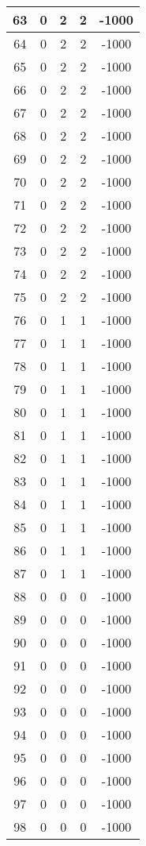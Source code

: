 \documentclass[letterpaper, 12pt]{article}
\begin{document}
\begin{longtable}{|c|c|c|c|c|}
\hline
63 & 0 & 2 & 2 & -1000 \\
\hline
64 & 0 & 2 & 2 & -1000 \\
\hline
65 & 0 & 2 & 2 & -1000 \\
\hline
66 & 0 & 2 & 2 & -1000 \\
\hline
67 & 0 & 2 & 2 & -1000 \\
\hline
68 & 0 & 2 & 2 & -1000 \\
\hline
69 & 0 & 2 & 2 & -1000 \\
\hline
70 & 0 & 2 & 2 & -1000 \\
\hline
71 & 0 & 2 & 2 & -1000 \\
\hline
72 & 0 & 2 & 2 & -1000 \\
\hline
73 & 0 & 2 & 2 & -1000 \\
\hline
74 & 0 & 2 & 2 & -1000 \\
\hline
75 & 0 & 2 & 2 & -1000 \\
\hline
76 & 0 & 1 & 1 & -1000 \\
\hline
77 & 0 & 1 & 1 & -1000 \\
\hline
78 & 0 & 1 & 1 & -1000 \\
\hline
79 & 0 & 1 & 1 & -1000 \\
\hline
80 & 0 & 1 & 1 & -1000 \\
\hline
81 & 0 & 1 & 1 & -1000 \\
\hline
82 & 0 & 1 & 1 & -1000 \\
\hline
83 & 0 & 1 & 1 & -1000 \\
\hline
84 & 0 & 1 & 1 & -1000 \\
\hline
85 & 0 & 1 & 1 & -1000 \\
\hline
86 & 0 & 1 & 1 & -1000 \\
\hline
87 & 0 & 1 & 1 & -1000 \\
\hline
88 & 0 & 0 & 0 & -1000 \\
\hline
89 & 0 & 0 & 0 & -1000 \\
\hline
90 & 0 & 0 & 0 & -1000 \\
\hline
91 & 0 & 0 & 0 & -1000 \\
\hline
92 & 0 & 0 & 0 & -1000 \\
\hline
93 & 0 & 0 & 0 & -1000 \\
\hline
94 & 0 & 0 & 0 & -1000 \\
\hline
95 & 0 & 0 & 0 & -1000 \\
\hline
96 & 0 & 0 & 0 & -1000 \\
\hline
97 & 0 & 0 & 0 & -1000 \\
\hline
98 & 0 & 0 & 0 & -1000 \\

\end{longtable}
\end{document}
